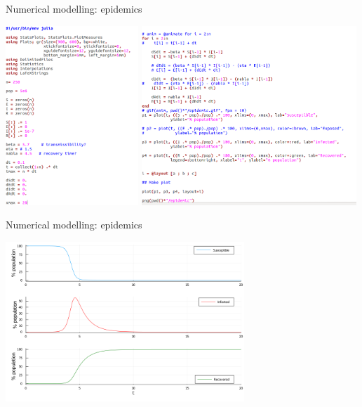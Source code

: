 

\begin{frame}{\insertsectionnumber{ |} Numerical modelling: epidemics}


\hspace*{-0.75cm}\includegraphics[height=6.75cm]{images/epi1D_1.png}
\hspace*{-0.1cm}\includegraphics[height=6.75cm]{images/epi1D_2.png}


\end{frame}





\begin{frame}{\insertsectionnumber{ |} Numerical modelling: epidemics}


\centering\includegraphics[width=9cm]{images/epidemic.png}\\


\end{frame}




